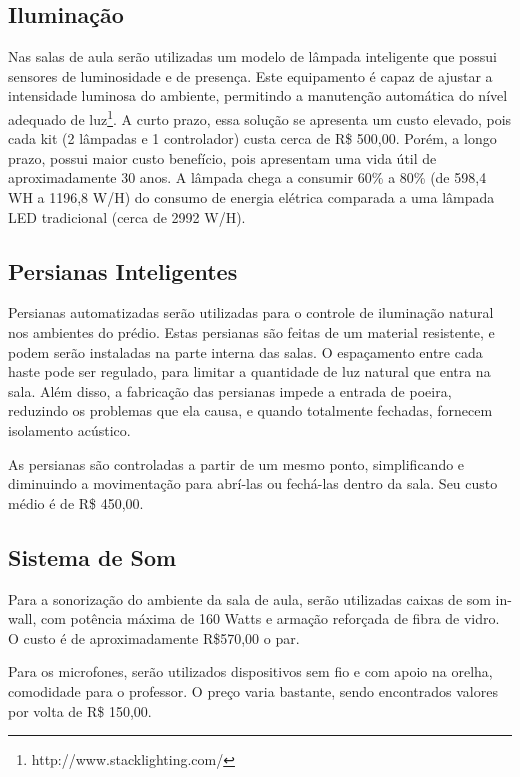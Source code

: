 \subsection{Iluminação}

Nas salas de aula serão utilizadas um modelo de lâmpada inteligente que possui
sensores de luminosidade e de presença. Este equipamento é capaz de ajustar a
intensidade luminosa do ambiente, permitindo a manutenção automática do nível
adequado de luz\footnote{ http://www.stacklighting.com/}. A curto prazo, essa solução se apresenta um custo elevado, pois
cada kit (2 lâmpadas e 1 controlador) custa cerca de R\$ 500,00. Porém, a longo
prazo, possui maior custo benefício, pois apresentam uma vida útil de
aproximadamente 30 anos. A lâmpada chega a consumir 60\% a 80\% (de 598,4 WH a
1196,8 W/H) do consumo de energia elétrica comparada a uma lâmpada LED
tradicional (cerca de 2992 W/H).

\subsection{Persianas Inteligentes}

Persianas automatizadas serão utilizadas para o controle de iluminação natural nos ambientes do prédio. Estas persianas são feitas de um material resistente, e podem serão instaladas na parte interna das salas. O espaçamento entre cada haste pode ser regulado, para limitar a quantidade de luz natural que entra na sala. Além disso, a fabricação das persianas impede a entrada de poeira, reduzindo os problemas que ela causa, e quando totalmente fechadas, fornecem isolamento acústico.

As persianas são controladas a partir de um mesmo ponto, simplificando e diminuindo a movimentação para abrí-las ou fechá-las dentro da sala. Seu custo médio é de R\$ 450,00.

\subsection{Sistema de Som}

Para a sonorização do ambiente da sala de aula, serão utilizadas caixas de som
in-wall, com potência máxima de 160 Watts e armação reforçada de fibra de vidro.
O custo é de aproximadamente R\$570,00 o par.

Para os microfones, serão utilizados dispositivos sem fio e com apoio na orelha,
comodidade para o professor. O preço varia bastante, sendo encontrados valores
por volta de R\$ 150,00.

